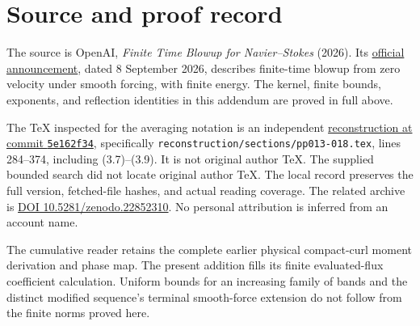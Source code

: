 \section{Source and proof record}
\label{eflux:sources}
The source is OpenAI, \emph{Finite Time Blowup for Navier--Stokes}
(2026). Its \href{https://openai.com/index/navier-stokes-solution/}{official
announcement}, dated 8 September 2026, describes finite-time blowup
from zero velocity under smooth forcing, with finite energy.
The kernel, finite bounds, exponents, and reflection identities in this
addendum are proved in full above.

The TeX inspected for the averaging notation is an independent
\href{https://github.com/KokunoYumeto/openai-navier-stokes-latex/tree/5e162f34cd2d3581f890660e81fbf063509085d0}{reconstruction at commit
\texttt{5e162f34}}, specifically
\texttt{reconstruction/sections/pp013-018.tex}, lines 284--374,
including (3.7)--(3.9). It is not original author TeX.
The supplied bounded search did not locate original author TeX.
The local record preserves the full version, fetched-file hashes,
and actual reading coverage. The related archive is
\href{https://doi.org/10.5281/zenodo.22852310}{DOI 10.5281/zenodo.22852310}.
No personal attribution is inferred from an account name.

The cumulative reader retains the complete earlier physical
compact-curl moment derivation and phase map. The present addition
fills its finite evaluated-flux coefficient calculation.
Uniform bounds for an increasing family of bands and the distinct
modified sequence's terminal smooth-force extension do not follow
from the finite norms proved here.
